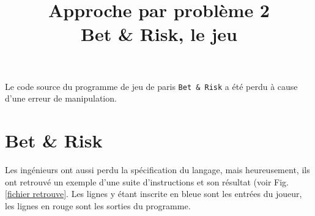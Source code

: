 \documentclass{article}
\title{Approche par problème 2\\ Bet \& Risk, le jeu}
\author{}
\date{}
\begin{document}
\maketitle
\thispagestyle{fancy}

Le code source du programme de jeu de paris {\tt Bet \& Risk} a été perdu à cause d'une erreur de manipulation.

\section{Bet \& Risk}

Les ingénieurs ont aussi perdu la spécification du langage, mais heureusement, ils ont retrouvé un exemple
d'une suite d'instructions et son résultat (voir Fig. \ref{fichier retrouve}. Les lignes y étant inscrite en bleue
sont les entrées du joueur, les lignes en rouge sont les sorties du programme.

\setlength{\columnseprule}{0.4pt}
\setlength{\marginparwidth}{0pt}
\end{document}
